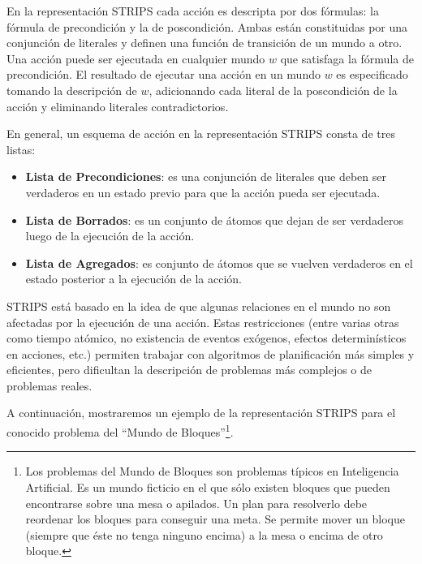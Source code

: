 En la representaci\'on STRIPS cada acci\'on es descripta por dos f\'ormulas: la f\'ormula 
de precondici\'on y la de poscondici\'on. Ambas est\'an constituidas por una conjunci\'on de 
literales y definen una funci\'on de transici\'on de un mundo a otro. Una acci\'on puede ser 
ejecutada en cualquier mundo $w$ que satisfaga la f\'ormula de precondici\'on. 
El resultado de ejecutar una acci\'on en un mundo $w$ es especificado tomando la 
descripci\'on de $w$, adicionando cada literal de la poscondici\'on de la acci\'on y 
eliminando literales contradictorios.

En general, un esquema de acci\'on en la representaci\'on STRIPS consta de tres listas:

\begin{itemize}

\item {\bf Lista de Precondiciones}: es una conjunci\'on de literales que deben ser verdaderos 
en un estado previo para que la acci\'on pueda ser ejecutada. 

\item {\bf Lista de Borrados}: es un conjunto de \'atomos que dejan de ser verdaderos
 luego de la ejecuci\'on de la acci\'on.

\item {\bf Lista de Agregados}: es conjunto de \'atomos que se vuelven verdaderos 
en el estado posterior a la ejecuci\'on de la acci\'on.

\end{itemize}

STRIPS est\'a basado en la idea de que algunas relaciones en el mundo 
no son afectadas por la ejecuci\'on de una acci\'on. 
Estas restricciones (entre varias otras como tiempo at\'omico, no
existencia de eventos ex\'ogenos, 
efectos determin\'isticos en acciones, etc.) permiten trabajar 
con algoritmos de planificaci\'on m\'as simples y eficientes, pero dificultan la 
descripci\'on de problemas m\'as complejos o de problemas reales.

A continuaci\'on, mostraremos un ejemplo de la representaci\'on STRIPS para el 
conocido pro\-ble\-ma del ``Mundo de Bloques''\footnote{Los problemas del Mundo de 
Bloques son problemas t\'ipicos en Inteligencia Artificial. Es un mundo ficticio
en el que s\'olo existen bloques que pueden encontrarse sobre una mesa o apilados. 
Un plan para resolverlo debe reordenar los bloques para conseguir una meta. Se 
permite mover un bloque (siempre que \'este no tenga ninguno encima) a la mesa o 
encima de otro bloque.}.


